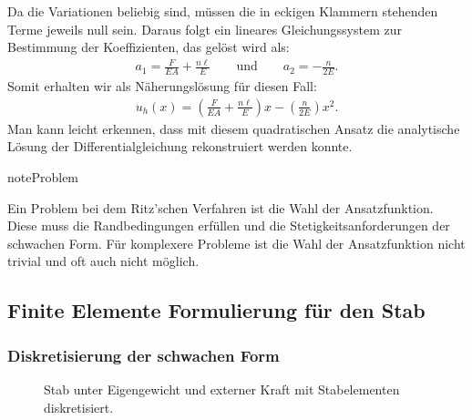 \documentclass[letterpaper,10pt,german]{jupyterBook}
\let\sphinxpxdimen\pdfpxdimen\else\newdimen\sphinxpxdimen
\begin{document}
\sphinxAtStartPar
Da die Variationen beliebig sind, müssen die in eckigen Klammern stehenden Terme jeweils null sein. Daraus folgt ein lineares Gleichungssystem zur Bestimmung der Koeffizienten, das gelöst wird als:
\begin{equation*}
\begin{split}a_1 = \frac{F}{EA} + \frac{n \ell}{E} \qquad \text{und} \qquad  a_2 = -\frac{n}{2E}.\end{split}
\end{equation*}
\sphinxAtStartPar
Somit erhalten wir als Näherungslösung für diesen Fall:
\begin{equation*}
\begin{split}u_h(x) = \left(\frac{F}{EA} + \frac{n \ell}{E}\right)x - \left(\frac{n}{2E}\right)x^2.\end{split}
\end{equation*}
\sphinxAtStartPar
Man kann leicht erkennen, dass mit diesem quadratischen Ansatz die analytische Lösung der Differentialgleichung rekonstruiert werden konnte.

\begin{sphinxadmonition}{note}{Problem}

\sphinxAtStartPar
Ein Problem bei dem Ritz’schen Verfahren ist die Wahl der Ansatzfunktion. Diese muss die Randbedingungen erfüllen und die Stetigkeitsanforderungen der schwachen Form. Für komplexere Probleme ist die Wahl der Ansatzfunktion nicht trivial \sphinxhyphen{} und oft auch nicht möglich.
\end{sphinxadmonition}


\subsection{Finite Elemente Formulierung für den Stab}
\label{\detokenize{chapters/chapter2/1dFEM:finite-elemente-formulierung-fur-den-stab}}

\subsubsection{Diskretisierung der schwachen Form}
\label{\detokenize{chapters/chapter2/1dFEM:diskretisierung-der-schwachen-form}}
\begin{figure}[htbp]
\centering
\capstart

\noindent\sphinxincludegraphics[width=600\sphinxpxdimen]{{Stab_element}.png}
\caption{Stab unter Eigengewicht und externer Kraft mit Stabelementen diskretisiert.}\label{\detokenize{chapters/chapter2/1dFEM:stabelement}}\end{figure}
\end{document}
